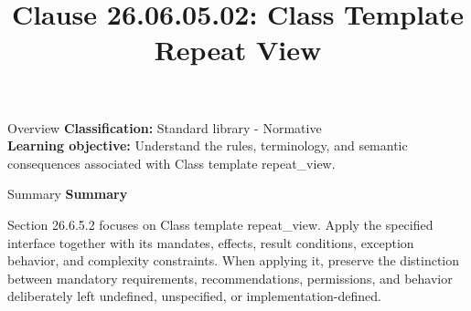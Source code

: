\documentclass[10pt,letterpaper]{article}
\title{Clause 26.06.05.02: Class Template Repeat View}
\author{}
\date{}
\begin{document}
\maketitle
\begin{CornellOverviewBox}{Overview}
\textbf{Classification:} Standard library - Normative\\[2pt]
\textbf{Learning objective:} Understand the rules, terminology, and semantic consequences associated with Class template repeat\_view.
\end{CornellOverviewBox}\begin{CornellSummaryBox}{Summary}
{\sffamily\bfseries\color{Accent} Summary}\par\vspace{3pt}Section 26.6.5.2 focuses on Class template repeat\_view. Apply the specified interface together with its mandates, effects, result conditions, exception behavior, and complexity constraints. When applying it, preserve the distinction between mandatory requirements, recommendations, permissions, and behavior deliberately left undefined, unspecified, or implementation-defined.
\end{CornellSummaryBox}
\end{document}
